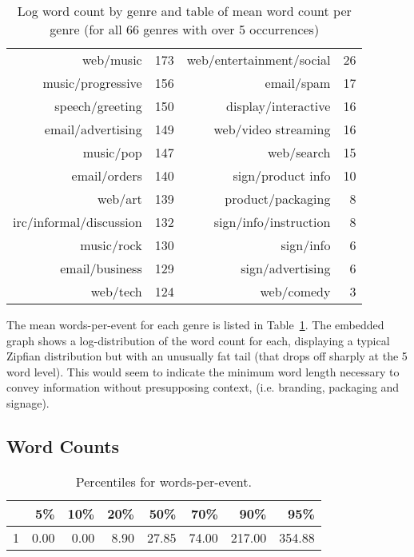 \begin{table}[ht]
\begin{tabular}{r r || r r}
        web/music &  173  &  web/entertainment/social &   26 \\
        music/progressive &  156  &  email/spam &   17 \\
        speech/greeting &  150  &  display/interactive &   16 \\
        email/advertising &  149  &  web/video streaming &   16 \\
        music/pop &  147  &  web/search &   15 \\
        email/orders &  140  &  sign/product info &   10 \\
        web/art &  139  &  product/packaging &    8 \\
        irc/informal/discussion &  132  &  sign/info/instruction &    8 \\
        music/rock &  130 &  sign/info &    6 \\
        email/business &  129  & sign/advertising &    6 \\
        web/tech &  124  & web/comedy &    3 \\
        \hline
    \end{tabular}
    

    \label{fig:personal:genreworddist}
    \caption{Log word count by genre and table of mean word count per genre (for all 66 genres with over 5 occurrences)}
\end{table}

The mean words-per-event for each genre is listed in Table~\ref{fig:personal:genreworddist}.  The embedded graph shows a log-distribution of the word count for each, displaying a typical Zipfian distribution but with an unusually fat tail (that drops off sharply at the 5 word level).  This would seem to indicate the minimum word length necessary to convey information without presupposing context, (i.e. branding, packaging and signage).







\subsection{Word Counts}

\begin{table}[ht]
    \centering

    \begin{tabular}{ | r | r | r | r | r | r | r | r | }
         \hline
         & 5\% & 10\% & 20\% & 50\% & 70\% & 90\% & 95\% \\ 
         \hline
         1 & 0.00 & 0.00 & 8.90 & 27.85 & 74.00 & 217.00 & 354.88 \\ 
         \hline
    \end{tabular}

    \caption{Percentiles for words-per-event.}
    \label{table:personal:wordsperevent}
\end{table}

